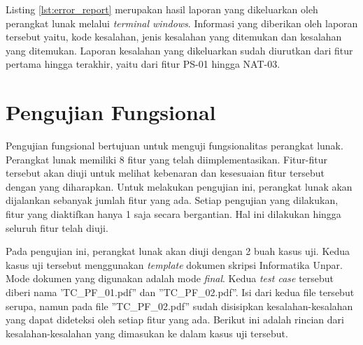 Listing \ref{lst:error_report} merupakan hasil laporan yang dikeluarkan oleh perangkat lunak melalui \textit{terminal windows}. Informasi yang diberikan oleh laporan tersebut yaitu, kode kesalahan, jenis kesalahan yang ditemukan dan kesalahan yang ditemukan. Laporan kesalahan yang dikeluarkan sudah diurutkan dari fitur pertama hingga terakhir, yaitu dari fitur PS-01 hingga NAT-03.

\section{Pengujian Fungsional}
Pengujian fungsional bertujuan untuk menguji fungsionalitas perangkat lunak. Perangkat lunak memiliki 8 fitur yang telah diimplementasikan. Fitur-fitur tersebut akan diuji untuk melihat kebenaran dan kesesuaian fitur tersebut dengan yang diharapkan. Untuk melakukan pengujian ini, perangkat lunak akan dijalankan sebanyak jumlah fitur yang ada. Setiap pengujian yang dilakukan, fitur yang diaktifkan hanya 1 saja secara bergantian. Hal ini dilakukan hingga seluruh fitur telah diuji.

Pada pengujian ini, perangkat lunak akan diuji dengan 2 buah kasus uji. Kedua kasus uji tersebut menggunakan \textit{template} dokumen skripsi Informatika Unpar. Mode dokumen yang digunakan adalah mode \textit{final}. Kedua \textit{test case} tersebut diberi nama 'TC\_PF\_01.pdf'' dan ''TC\_PF\_02.pdf''. Isi dari kedua file tersebut serupa, namun pada file ''TC\_PF\_02.pdf'' sudah disisipkan kesalahan-kesalahan yang dapat dideteksi oleh setiap fitur yang ada. Berikut ini adalah rincian dari kesalahan-kesalahan yang dimasukan ke dalam kasus uji tersebut.

